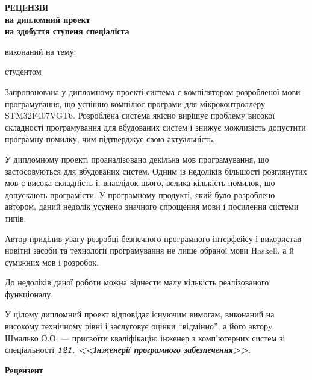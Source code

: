 \documentclass[main.tex]{subfiles}
\begin{document}
\begin{otherspecialpage}
  \begin{singlespacing}
  \begin{center}
    \textbf{
      {\large РЕЦЕНЗІЯ}\\
      на дипломний проект\\
      на здобуття ступеня спеціаліста
    }\\
  \end{center}

  \noindent виконаний на тему: \fillin{\thesistitle\hfill\mbox{}}

  \noindent студентом \fillinline{}\\\vspace{5mm}
  \end{singlespacing}


  Запропонована у дипломному проекті система є компілятором розробленої мови програмування, що успішно компілює програми для мікроконтроллеру STM32F407VGT6. Розроблена система якісно вирішує проблему високої складності програмування для вбудованих систем і знижує можливість допустити програмну помилку, чим підтверджує свою актуальність.

У дипломному проекті проаналізовано декілька мов програмування, що застосовуються для вбудованих систем. Одним із недоліків більшості розглянутих мов є висока складність і, внаслідок цього, велика кількість помилок, що допускають програмісти. У програмному продукті, який було розроблено автором, даний недолік усунено значного спрощення мови і посилення системи типів.

Автор приділив увагу розробці безпечного програмного інтерфейсу і використав новітні засоби та технології програмування не лише обраної мови Haskell, а й суміжних мов і розробок.

До недоліків даної роботи можна віднести малу кількість реалізованого функціоналу.

У цілому дипломний проект відповідає існуючим вимогам, виконаний на високому технічному рівні і заслуговує оцінки ``відмінно'', а його авторy, Шмалько О.О. --- присвоїти кваліфікацію інженер з комп'ютерних систем зі спеціальності \underline{\emph{\textbf{121. <<Інженерії програмного забезпечення>>}}}.

  \vfill

  \noindent
  \textbf{Рецензент}\\
  \hfill
  \fillin[(підпис)]{\hspace{22mm}}
  \hfill

  \vfill

\end{otherspecialpage}
\end{document}
